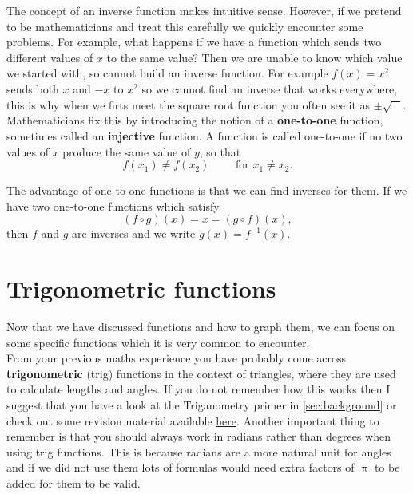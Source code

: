 The concept of an inverse function makes intuitive sense. However, if we pretend to be mathematicians and treat this carefully we quickly encounter some problems. For example, what happens if we have a function which sends two different values of $x$ to the same value? Then we are unable to know which value we started with, so cannot build an inverse function. For example $f(x)=x^{2}$ sends both $x$ and $-x$ to $x^{2}$ so we cannot find an inverse that works everywhere, this is why when we firts meet the square root function you often see it as $\pm\sqrt{\phantom{+}}$.\\

Mathematicians fix this by introducing the notion of a \textbf{\gls{one-to-one}} function, sometimes called an \textbf{injective} function. A function is called one-to-one if no two values of $x$ produce the same value of $y$, so that
\begin{equation*}
f(x_{1})\neq f(x_{2}) \qquad \text{ for } x_{1}\neq x_{2}.
\end{equation*}

The advantage of one-to-one functions is that we can find inverses for them. If we have two one-to-one functions which satisfy 
\begin{equation*}
\left(f\circ g\right)(x)=x=\left(g\circ f\right)(x),
\end{equation*}
then $f$ and $g$ are inverses and we write $g(x)=f^{-1}(x)$.

\section{Trigonometric functions}
\label{sec: trig func}

Now that we have discussed functions and how to graph them, we can focus on some specific functions which it is very common to encounter.\\ 

From your previous maths experience you have probably come across \textbf{\gls{trigonometric}} (trig) functions in the context of triangles, where they are used to calculate lengths and angles. If you do not remember how this works then I suggest that you have a look at the Triganometry primer in \cref{sec:background} or check out some revision material available \href{https://corbettmaths.com/2013/03/30/trigonometry-introduction/}{here}. Another important thing to remember is that you should always work in radians rather than degrees when using trig functions. This is because radians are a more natural unit for angles and if we did not use them lots of formulas would need extra factors of $\uppi$ to be added for them to be valid. \\

